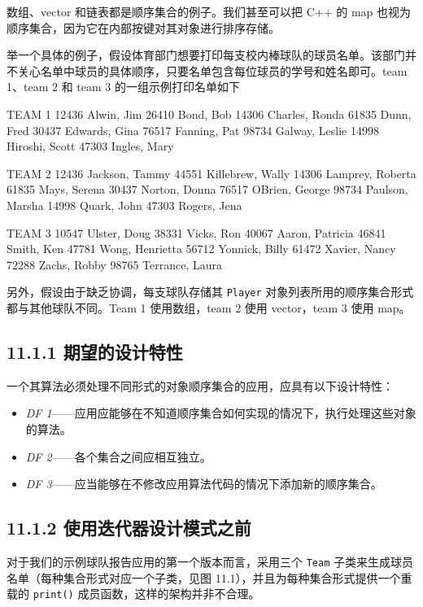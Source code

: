 数组、vector 和链表都是顺序集合的例子。我们甚至可以把 C++ 的 map 也视为顺序集合，因为它在内部按键对其对象进行排序存储。

举一个具体的例子，假设体育部门想要打印每支校内棒球队的球员名单。该部门并不关心名单中球员的具体顺序，只要名单包含每位球员的学号和姓名即可。team 1、team 2 和 team 3 的一组示例打印名单如下

\begin{codebox}
TEAM 1
12436 Alwin, Jim
26410 Bond, Bob
14306 Charles, Ronda
61835 Dunn, Fred
30437 Edwards, Gina
76517 Fanning, Pat
98734 Galway, Leslie
14998 Hiroshi, Scott
47303 Ingles, Mary

TEAM 2
12436 Jackson, Tammy
44551 Killebrew, Wally
14306 Lamprey, Roberta
61835 Mays, Serena
30437 Norton, Donna
76517 OBrien, George
98734 Paulson, Marsha
14998 Quark, John
47303 Rogers, Jena

TEAM 3
10547 Ulster, Doug
38331 Vicks, Ron
40067 Aaron, Patricia
46841 Smith, Ken
47781 Wong, Henrietta
56712 Yonnick, Billy
61472 Xavier, Nancy
72288 Zachs, Robby
98765 Terrance, Laura
\end{codebox}

另外，假设由于缺乏协调，每支球队存储其 \texttt{Player} 对象列表所用的顺序集合形式都与其他球队不同。Team 1 使用数组，team 2 使用 vector，team 3 使用 map。

\subsection{11.1.1 期望的设计特性}

一个其算法必须处理不同形式的对象顺序集合的应用，应具有以下设计特性：

\begin{itemize}
\item \emph{DF 1}——应用应能够在不知道顺序集合如何实现的情况下，执行处理这些对象的算法。
\item \emph{DF 2}——各个集合之间应相互独立。
\item \emph{DF 3}——应当能够在不修改应用算法代码的情况下添加新的顺序集合。
\end{itemize}

\subsection{11.1.2 使用迭代器设计模式之前}

对于我们的示例球队报告应用的第一个版本而言，采用三个 \texttt{Team} 子类来生成球员名单（每种集合形式对应一个子类，见图 11.1），并且为每种集合形式提供一个重载的 \texttt{print()} 成员函数，这样的架构并非不合理。


